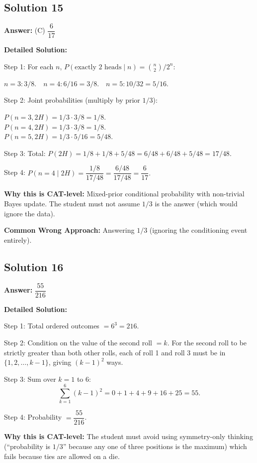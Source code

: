 \documentclass[11pt]{article}
\begin{document}
\subsection*{Solution 15}
\textbf{Answer:} (C) \( \dfrac{6}{17} \)

\textbf{Detailed Solution:}

Step 1: For each \( n \), \( P(\text{exactly 2 heads} \mid n) = \binom{n}{2}/2^n \):

\( n=3: 3/8. \quad n=4: 6/16 = 3/8. \quad n=5: 10/32 = 5/16. \)

Step 2: Joint probabilities (multiply by prior \( 1/3 \)):

\( P(n=3, 2H) = 1/3 \cdot 3/8 = 1/8. \) \\
\( P(n=4, 2H) = 1/3 \cdot 3/8 = 1/8. \) \\
\( P(n=5, 2H) = 1/3 \cdot 5/16 = 5/48. \)

Step 3: Total: \( P(2H) = 1/8 + 1/8 + 5/48 = 6/48 + 6/48 + 5/48 = 17/48. \)

Step 4: \( P(n=4 \mid 2H) = \dfrac{1/8}{17/48} = \dfrac{6/48}{17/48} = \dfrac{6}{17}. \)

\textbf{Why this is CAT-level:} Mixed-prior conditional probability with non-trivial Bayes update. The student must not assume \( 1/3 \) is the answer (which would ignore the data).

\textbf{Common Wrong Approach:} Answering \( 1/3 \) (ignoring the conditioning event entirely).

\subsection*{Solution 16}
\textbf{Answer:} \( \dfrac{55}{216} \)

\textbf{Detailed Solution:}

Step 1: Total ordered outcomes \( = 6^3 = 216 \).

Step 2: Condition on the value of the second roll \( = k \). For the second roll to be strictly greater than both other rolls, each of roll 1 and roll 3 must be in \( \{1, 2, \ldots, k-1\} \), giving \( (k-1)^2 \) ways.

Step 3: Sum over \( k = 1 \) to 6:
\[
\sum_{k=1}^{6} (k-1)^2 = 0 + 1 + 4 + 9 + 16 + 25 = 55.
\]

Step 4: Probability \( = \dfrac{55}{216} \).

\textbf{Why this is CAT-level:} The student must avoid using symmetry-only thinking (``probability is \( 1/3 \)'' because any one of three positions is the maximum) which fails because ties are allowed on a die.
\end{document}
